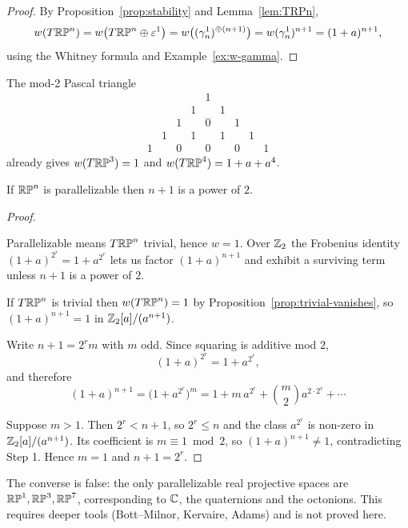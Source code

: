 \begin{proof}
By Proposition~\ref{prop:stability} and Lemma~\ref{lem:TRPn},
\[
w(T\mathbb{RP}^n)=w\big(T\mathbb{RP}^n\oplus\varepsilon^1\big)
=w\big((\gamma^1_n)^{\oplus(n+1)}\big)
=w(\gamma^1_n)^{n+1}=(1+a)^{n+1},
\]
using the Whitney formula and Example~\ref{ex:w-gamma}.
\end{proof}

The mod-2 Pascal triangle
\[
\begin{array}{ccccccccc}
 & & & &1& & & &\\
 & & &1& &1& & &\\
 & &1& &0& &1& &\\
 &1& &1& &1& &1&\\
1& &0& &0& &0& &1
\end{array}
\]
already gives $w(T\mathbb{RP}^3)=1$ and $w(T\mathbb{RP}^4)=1+a+a^4$.

\begin{corollary}[Stiefel]\label{cor:parallelizable}
If $\mathbb{RP}^n$ is parallelizable then $n+1$ is a power of $2$.
\end{corollary}

\begin{proof}
\begin{strategy}
Parallelizable means $T\mathbb{RP}^n$ trivial, hence $w=1$. Over $\mathbb{Z}_2$ the Frobenius
identity $(1+a)^{2^r}=1+a^{2^r}$ lets us factor $(1+a)^{n+1}$ and exhibit a
surviving term unless $n+1$ is a power of $2$.
\end{strategy}

 If $T\mathbb{RP}^n$ is trivial then $w(T\mathbb{RP}^n)=1$ by
Proposition~\ref{prop:trivial-vanishes}, so $(1+a)^{n+1}=1$ in
$\mathbb{Z}_2[a]/(a^{n+1})$.

 Write $n+1=2^r m$ with $m$ odd. Since squaring is additive mod $2$,
\[
(1+a)^{2^r}=1+a^{2^r},
\]
and therefore
\[
(1+a)^{n+1}=\big(1+a^{2^r}\big)^{m}
=1+m\,a^{2^r}+\binom{m}{2}a^{2\cdot 2^r}+\cdots
\]

 Suppose $m>1$. Then $2^r<n+1$, so $2^r\le n$ and the class $a^{2^r}$ is
non-zero in $\mathbb{Z}_2[a]/(a^{n+1})$. Its coefficient is $m\equiv1\bmod2$, so
$(1+a)^{n+1}\neq1$, contradicting Step 1. Hence $m=1$ and $n+1=2^r$.
\end{proof}

\begin{remark}
The converse is false: the only parallelizable real projective spaces are
$\mathbb{RP}^1,\mathbb{RP}^3,\mathbb{RP}^7$, corresponding to $\mathbb{C}$, the quaternions and the octonions.
This requires deeper tools (Bott--Milnor, Kervaire, Adams) and is not proved
here.
\end{remark}

